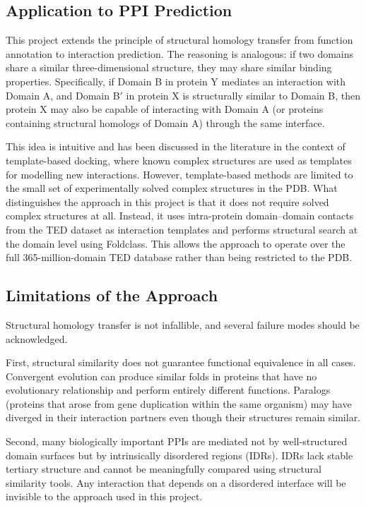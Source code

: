\subsection{Application to PPI Prediction}

This project extends the principle of structural homology transfer from function annotation to interaction prediction.
The reasoning is analogous: if two domains share a similar three-dimensional structure, they may share similar binding properties.
Specifically, if Domain B in protein Y mediates an interaction with Domain A, and Domain B$'$ in protein X is structurally similar to Domain B, then protein X may also be capable of interacting with Domain A (or proteins containing structural homologs of Domain A) through the same interface.

This idea is intuitive and has been discussed in the literature in the context of template-based docking, where known complex structures are used as templates for modelling new interactions.
However, template-based methods are limited to the small set of experimentally solved complex structures in the PDB.
What distinguishes the approach in this project is that it does not require solved complex structures at all.
Instead, it uses intra-protein domain--domain contacts from the TED dataset as interaction templates and performs structural search at the domain level using Foldclass.
This allows the approach to operate over the full 365-million-domain TED database rather than being restricted to the PDB.

\subsection{Limitations of the Approach}

Structural homology transfer is not infallible, and several failure modes should be acknowledged.

First, structural similarity does not guarantee functional equivalence in all cases.
Convergent evolution can produce similar folds in proteins that have no evolutionary relationship and perform entirely different functions.
Paralogs (proteins that arose from gene duplication within the same organism) may have diverged in their interaction partners even though their structures remain similar.

Second, many biologically important PPIs are mediated not by well-structured domain surfaces but by intrinsically disordered regions (IDRs).
IDRs lack stable tertiary structure and cannot be meaningfully compared using structural similarity tools.
Any interaction that depends on a disordered interface will be invisible to the approach used in this project.

